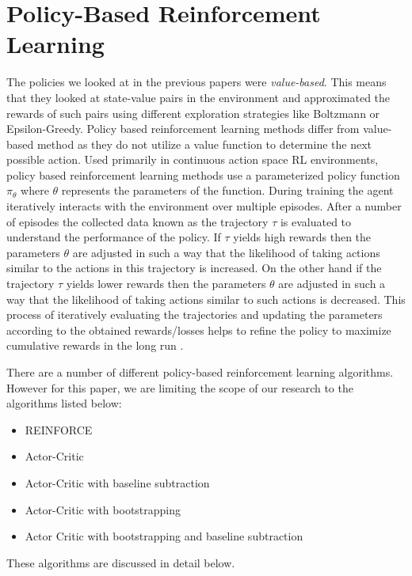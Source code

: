 \documentclass{article}
\begin{document}
\section{Policy-Based Reinforcement Learning}
The policies we looked at in the previous papers were \emph{value-based}. This means that they looked at state-value pairs in the environment and approximated the rewards of such pairs using different exploration strategies like Boltzmann or Epsilon-Greedy. Policy based reinforcement learning methods differ from value-based method as they do not utilize a value function to determine the next possible action. Used primarily in  continuous action space RL environments, policy based reinforcement learning methods use a parameterized policy function $\pi_\theta$ where $\theta$ represents the parameters of the function.
During training the agent iteratively interacts with the environment over multiple episodes. After a number of episodes the collected data known as the trajectory $\tau$ is evaluated to understand the performance of the policy. If $\tau$ yields high rewards then the parameters $\theta$ are adjusted in such a way that the likelihood of taking actions similar to the actions in this trajectory is increased. On the other hand if the trajectory $\tau$ yields lower rewards then the parameters $\theta$ are adjusted in such a way that the likelihood of taking actions similar to such actions is decreased. This process of iteratively evaluating the trajectories and updating the parameters according to the obtained rewards/losses helps to refine the policy to maximize cumulative rewards in the long run \cite{plaat-deeprl}.

There are a number of different policy-based reinforcement learning algorithms. However for this paper, we are limiting the scope of our research to the algorithms listed below: 

\begin{itemize}
\item REINFORCE
\item Actor-Critic
\item Actor-Critic with baseline subtraction
\item Actor-Critic with bootstrapping
\item Actor Critic with bootstrapping and baseline subtraction
\end{itemize}
These algorithms are discussed in detail below. 
\end{document}
